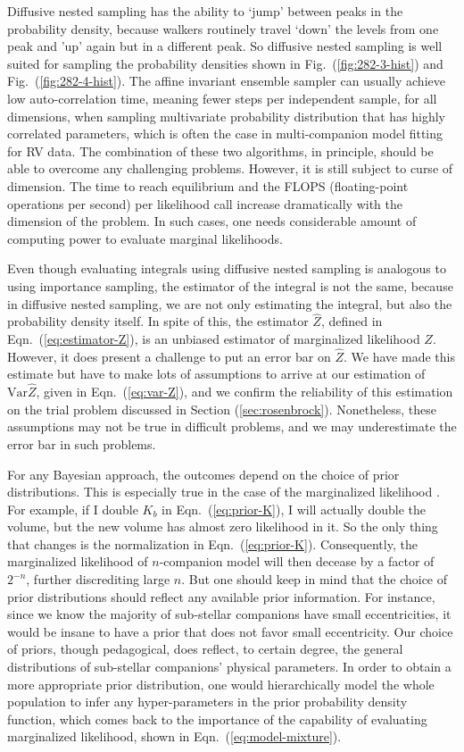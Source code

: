 \documentclass[letterpaper, preprint]{aastex}
\newcommand{\var}{\mathrm{Var}}
\begin{document}
Diffusive nested sampling has the ability to `jump' between peaks in the probability density, because walkers routinely travel `down' the levels from one peak and 'up' again but in a different peak. So diffusive nested sampling is well suited for sampling the probability densities shown in Fig.~(\ref{fig:282-3-hist}) and Fig.~(\ref{fig:282-4-hist}). The affine invariant ensemble sampler can usually achieve low auto-correlation time, meaning fewer steps per independent sample, for all dimensions, when sampling multivariate probability distribution that has highly correlated parameters, which is often the case in multi-companion model fitting for RV data. The combination of these two algorithms, in principle, should be able to overcome any challenging problems. However, it is still subject to curse of dimension. The time to reach equilibrium and the FLOPS (floating-point operations per second) per likelihood call increase dramatically with the dimension of the problem. In such cases, one needs considerable amount of computing power to evaluate marginal likelihoods.

Even though evaluating integrals using diffusive nested sampling is analogous to using importance sampling, the estimator of the integral is not the same, because in diffusive nested sampling, we are not only estimating the integral, but also the probability density itself. In spite of this, the estimator $\widehat{Z}$, defined in Eqn.~(\ref{eq:estimator-Z}), is an unbiased estimator of marginalized likelihood $Z$. However, it does present a challenge to put an error bar on $\widehat{Z}$. We have made this estimate but have to make lots of assumptions to arrive at our estimation of $\var \widehat{Z}$, given in Eqn.~(\ref{eq:var-Z}), and we confirm the reliability of this estimation on the trial problem discussed in Section (\ref{sec:rosenbrock}). Nonetheless, these assumptions may not be true in difficult problems, and we may underestimate the error bar in such problems.

For any Bayesian approach, the outcomes depend on the choice of prior distributions. This is especially true in the case of the marginalized likelihood \citep{jaynes03a, cameron13a}. For example, if I double $K_b$ in Eqn.~(\ref{eq:prior-K}), I will actually double the volume, but the new volume has almost zero likelihood in it. So the only thing that changes is the normalization in Eqn.~(\ref{eq:prior-K}). Consequently, the marginalized likelihood of $n$-companion model will then decease by a factor of $2^{-n}$, further discrediting large $n$. But one should keep in mind that the choice of prior distributions should reflect any available prior information. For instance, since we know the majority of sub-stellar companions have small eccentricities, it would be insane to have a prior that does not favor small eccentricity. Our choice of priors, though pedagogical, does reflect, to certain degree, the general distributions of sub-stellar companions' physical parameters. In order to obtain a more appropriate prior distribution, one would hierarchically model the whole population to infer any hyper-parameters in the prior probability density function, which comes back to the importance of the capability of evaluating marginalized likelihood, shown in Eqn.~(\ref{eq:model-mixture}).
\end{document}
